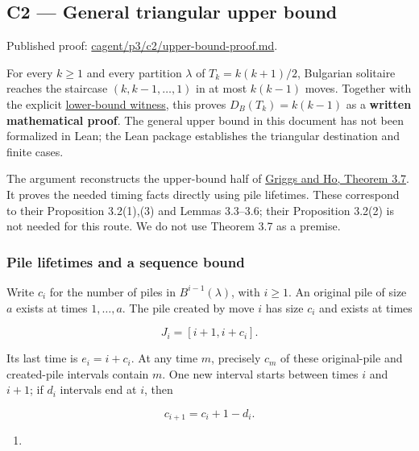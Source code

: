 \documentclass[11pt,a4paper]{article}
\providecommand{\tightlist}{\setlength{\itemsep}{0pt}\setlength{\parskip}{0pt}}
\begin{document}
\subsection{C2 --- General triangular upper bound}\label{c2-general-triangular-upper-bound}

Published proof: \href{https://github.com/mpelteshki/climbing-to-the-frontier/blob/212bba53b1818c08c40b8c4b48f636651eaf6410/cagent/p3/c2/upper-bound-proof.md}{cagent/p3/c2/upper-bound-proof.md}.

For every \(k\ge1\) and every partition \(\lambda\) of \(T_k=k(k+1)/2\), Bulgarian solitaire reaches the staircase \((k,k-1,\ldots,1)\) in at most \(k(k-1)\) moves. Together with the explicit \href{https://github.com/mpelteshki/climbing-to-the-frontier/blob/212bba53b1818c08c40b8c4b48f636651eaf6410/cagent/p3/c2/lower-bound-proof.md}{lower-bound witness}, this proves \(D_B(T_k)=k(k-1)\) as a \textbf{written mathematical proof}. The general upper bound in this document has not been formalized in Lean; the Lean package establishes the triangular destination and finite cases.

The argument reconstructs the upper-bound half of \href{https://sc.edu/study/colleges_schools/artsandsciences/mathematics/research/imi/research/documents/1998/1998_12.pdf}{Griggs and Ho, Theorem 3.7}. It proves the needed timing facts directly using pile lifetimes. These correspond to their Proposition 3.2(1),(3) and Lemmas 3.3--3.6; their Proposition 3.2(2) is not needed for this route. We do not use Theorem 3.7 as a premise.

\subsubsection{Pile lifetimes and a sequence bound}\label{pile-lifetimes-and-a-sequence-bound}

Write \(c_i\) for the number of piles in \(B^{i-1}(\lambda)\), with \(i\ge1\). An original pile of size \(a\) exists at times \(1,\ldots,a\). The pile created by move \(i\) has size \(c_i\) and exists at times

\[
J_i=[i+1,i+c_i].
\]

Its last time is \(e_i=i+c_i\). At any time \(m\), precisely \(c_m\) of these original-pile and created-pile intervals contain \(m\). One new interval starts between times \(i\) and \(i+1\); if \(d_i\) intervals end at \(i\), then

\[
c_{i+1}=c_i+1-d_i.
\]

\begin{enumerate}
\def\labelenumi{(\arabic{enumi})}
\tightlist
\item
\end{enumerate}
\end{document}
